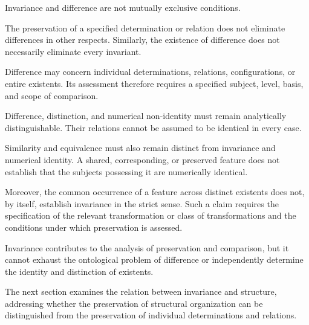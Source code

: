 Invariance and difference are not
mutually exclusive conditions.

The preservation of a specified
determination or relation does not
eliminate differences in other respects.
Similarly, the existence of difference
does not necessarily eliminate every
invariant.

Difference may concern individual
determinations, relations, configurations,
or entire existents. Its assessment
therefore requires a specified subject,
level, basis, and scope of comparison.

Difference, distinction, and numerical
non-identity must remain analytically
distinguishable. Their relations cannot
be assumed to be identical in every case.

Similarity and equivalence must also
remain distinct from invariance and
numerical identity. A shared, corresponding,
or preserved feature does not establish
that the subjects possessing it are
numerically identical.

Moreover, the common occurrence of
a feature across distinct existents
does not, by itself, establish invariance
in the strict sense. Such a claim
requires the specification of the
relevant transformation or class of
transformations and the conditions
under which preservation is assessed.

Invariance contributes to the analysis
of preservation and comparison, but
it cannot exhaust the ontological
problem of difference or independently
determine the identity and distinction
of existents.

The next section examines the relation
between invariance and structure,
addressing whether the preservation
of structural organization can be
distinguished from the preservation
of individual determinations and
relations.

